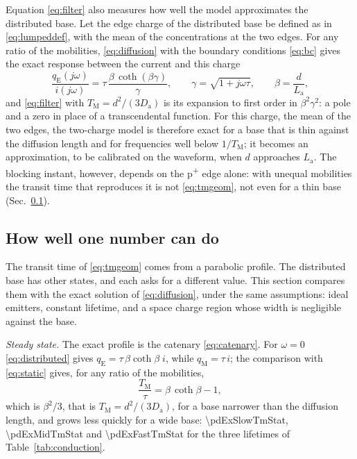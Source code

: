 \documentclass[10pt,a4paper]{scrartcl}
\newcommand{\TM}{T_\mathrm{M}}
\newcommand{\qE}{q_\mathrm{E}}
\newcommand{\qM}{q_\mathrm{M}}
\newcommand{\Da}{D_\mathrm{a}}
\newcommand{\La}{L_\mathrm{a}}
\newcommand{\Pp}{p\textsuperscript{+}}
\begin{document}
Equation \eqref{eq:filter} also measures how well the model approximates the distributed base. Let the edge charge of the distributed base be defined as in \eqref{eq:lumpeddef}, with the mean of the concentrations at the two edges. For any ratio of the mobilities, \eqref{eq:diffusion} with the boundary conditions \eqref{eq:bc} gives the exact response between the current and this charge
\begin{equation}
\frac{\qE(j\omega)}{i(j\omega)} = \tau\,\frac{\beta\,\coth(\beta\gamma)}{\gamma} , \qquad \gamma = \sqrt{1+j\omega\tau} , \qquad \beta = \frac{d}{\La} ,
\label{eq:distributed}
\end{equation}
and \eqref{eq:filter} with $\TM = d^2/(3\Da)$ is its expansion to first order in $\beta^2\gamma^2$: a pole and a zero in place of a transcendental function. For this charge, the mean of the two edges, the two-charge model is therefore exact for a base that is thin against the diffusion length and for frequencies well below $1/\TM$; it becomes an approximation, to be calibrated on the waveform, when $d$ approaches $\La$. The blocking instant, however, depends on the \Pp{} edge alone: with unequal mobilities the transit time that reproduces it is not \eqref{eq:tmgeom}, not even for a thin base (Sec.~\ref{sec:onenumber}).
\subsection{How well one number can do}
\label{sec:onenumber}
The transit time of \eqref{eq:tmgeom} comes from a parabolic profile. The distributed base has other states, and each asks for a different value. This section compares them with the exact solution of \eqref{eq:diffusion}, under the same assumptions: ideal emitters, constant lifetime, and a space charge region whose width is negligible against the base.

\emph{Steady state.} The exact profile is the catenary \eqref{eq:catenary}. For $\omega = 0$ \eqref{eq:distributed} gives $\qE = \tau\,\beta\coth\beta\;i$, while $\qM = \tau\,i$; the comparison with \eqref{eq:static} gives, for any ratio of the mobilities,
\begin{equation}
\frac{\TM}{\tau} = \beta\,\coth\beta - 1 ,
\label{eq:tmstatic}
\end{equation}
which is $\beta^2/3$, that is $\TM = d^2/(3\Da)$, for a base narrower than the diffusion length, and grows less quickly for a wide base: \num{\pdExSlowTmStat}, \num{\pdExMidTmStat} and \num{\pdExFastTmStat} for the three lifetimes of Table~\ref{tab:conduction}.
\end{document}
